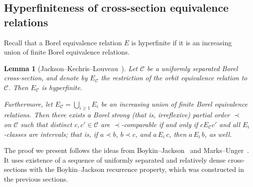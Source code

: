 \documentclass[11pt]{paper}
\newtheorem{lemma}{Lemma}
\newcommand{\cC}{\mathcal C}
\begin{document}
\subsection{Hyperfiniteness of cross-section equivalence relations}
\label{s:hyperfinite}
Recall that a Borel equivalence relation $E$ is hyperfinite
if it is an increasing union of finite Borel equivalence relations.
\begin{lemma}[Jackson--Kechris--Louveau~\cite{JKL}]
\label{thm:hyperfinite}
Let $\cC$ be a uniformly separated Borel cross-section, and denote by $E_{\cC}$ the restriction of the
orbit equivalence relation to $\cC$. Then $E_\cC$ is hyperfinite.

Furthermore, let $E_\cC= \bigcup_{i\ge 1} E_i$ be an increasing union of
finite Borel equivalence relations.
Then there exists a Borel strong {\rm (}that is, irreflexive{\rm )}
partial order $\prec$ on $\cC$ such that distinct \(c, c' \in \cC\) are \(\prec\)-comparable if and only if
\(c E_{\cC} c'\) and all \(E_{i}\)-classes are intervals; that is, if $a\prec b$, $b\prec c$, and $a\,E_i\,c$,
then $a\,E_i\,b$, as well.
\end{lemma}
The proof we present follows the ideas from Boykin--Jackson~\cite{BJ} and
Marks--Unger~\cite[Lemma~A.2]{Marks-Unger}.  It uses existence of a sequence of uniformly separated
and relatively dense cross-sections with the Boykin--Jackson recurrence property, which was constructed in the
previous sections.
\end{document}
